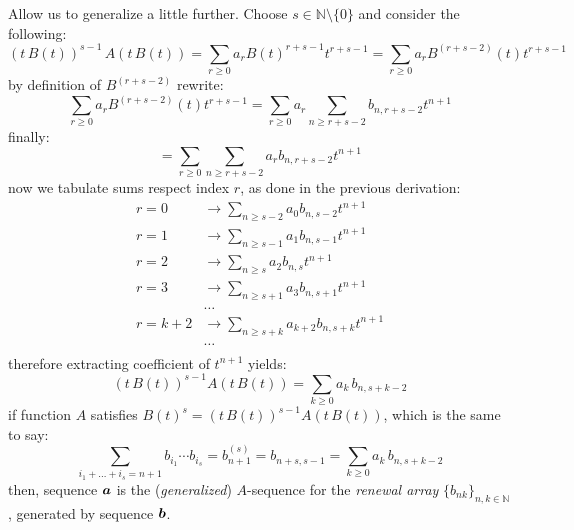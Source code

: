 \iftrue
Allow us to generalize a little further. Choose 
$s\in\mathbb{N}\setminus\lbrace0\rbrace$ and consider the following:
\begin{displaymath}
    (t\,B(t))^{s-1}\,A\left(t\,B(t)\right) 
        = \sum_{r\geq 0}{a_{r}B(t)^{r+s-1}t^{r+s-1}}
        = \sum_{r\geq 0}{a_{r}B^{(r+s-2)}(t)t^{r+s-1}}
\end{displaymath}
by definition of $B^{(r+s-2)}$ rewrite:
\begin{displaymath}
    \sum_{r\geq 0}{a_{r}B^{(r+s-2)}(t)t^{r+s-1}}
        =\sum_{r\geq 0}{a_{r}\sum_{n\geq r+s-2}{b_{n,r+s-2}t^{n+1}}}
\end{displaymath}
finally:
\begin{displaymath}
    =\sum_{r\geq 0}{\sum_{n\geq r+s-2}{a_{r}b_{n,r+s-2}t^{n+1}}}
\end{displaymath}
now we tabulate sums respect index $r$, as done in the previous derivation:
\begin{displaymath}
    \begin{split}
        r=0 &\rightarrow \sum_{n\geq s-2}{a_{0}b_{n,s-2}t^{n+1}}\\
        r=1 &\rightarrow \sum_{n\geq s-1}{a_{1}b_{n,s-1}t^{n+1}}\\
        r=2 &\rightarrow \sum_{n\geq s}{a_{2}b_{n,s}t^{n+1}}\\
        r=3 &\rightarrow \sum_{n\geq s+1}{a_{3}b_{n,s+1}t^{n+1}}\\
        &\ldots\\
        r=k+2 &\rightarrow \sum_{n\geq s+k}{a_{k+2}b_{n,s+k}t^{n+1}}\\
        &\ldots\\
    \end{split}
\end{displaymath}
therefore extracting coefficient of $t^{n+1}$ yields:
\begin{displaymath}
    [t^{n+1}](t\,B(t))^{s-1}A(t\,B(t))=\sum_{k\geq 0}{a_{k}\,b_{n,s+k-2}}
\end{displaymath}
if function $A$ satisfies $B(t)^{s}=(t\,B(t))^{s-1}A(t\,B(t))$, 
    which is the same to say:
\begin{displaymath}
    \sum_{i_{1}+\ldots+i_{s}=n+1}{b_{i_{1}}\cdots b_{i_{s}}}
        =b_{n+1}^{(s)}
        =b_{n+s,s-1}
        =\sum_{k\geq 0}{a_{k}\,b_{n,s+k-2}}
\end{displaymath}
then, sequence $\boldsymbol{a}$ 
is the (\emph{generalized}) $A$-sequence for the \emph{renewal array}
$\lbrace b_{nk}\rbrace_{n,k\in\mathbb{N}}$, generated by sequence $\boldsymbol{b}$.
\fi
















